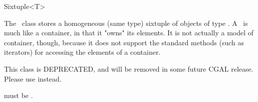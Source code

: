 \begin{ccRefClass}{Sixtuple<T>}
  
  \ccDefinition The \ccRefName\ class stores a homogeneous (same type)
  sixtuple of objects of type .  A \ccRefName\ is much like a
  container, in that it "owns" its elements. It is not actually a model of
  container, though, because it does not support the standard methods (such as
  iterators) for accessing the elements of a container.

  This class is DEPRECATED, and will be removed in some future CGAL release.
  Please use  instead.

  
  \ccRequirements {} must be .


  \ccTypes

  \ccGlue
  \ccGlue
  \ccGlue
  \ccGlue
  \ccGlue

  \ccCreation
  
  
  
\end{ccRefClass}


